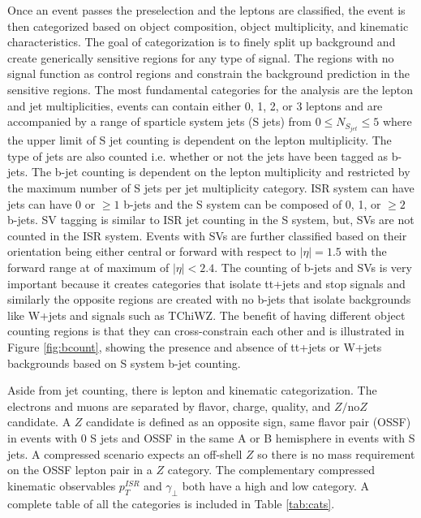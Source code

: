 Once an event passes the preselection and the leptons are classified, the event is then categorized based on object composition, object multiplicity, and kinematic characteristics. The goal of categorization is to finely split up background and create generically sensitive regions for any type of signal. The regions with no signal function as control regions and constrain the background prediction in the sensitive regions. The most fundamental categories for the analysis are the lepton and jet multiplicities, events can contain either 0, 1, 2, or 3 leptons and are accompanied by a range of sparticle system jets (S jets) from $0\leq N_{S_{jet}} \leq 5$ where the upper limit of S jet counting is dependent on the lepton multiplicity. The type of jets are also counted i.e. whether or not the jets have been tagged as b-jets. The b-jet counting is dependent on the lepton multiplicity and restricted by the maximum number of S jets per jet multiplicity category.  ISR system can have jets can have 0 or $\geq 1$ b-jets and the S system can be composed of 0, 1, or $\geq2$ b-jets. SV tagging is similar to ISR jet counting in the S system, but, SVs are not counted in the ISR system. Events with SVs are further classified based on their orientation being either central or forward with respect to $|\eta|=1.5$ with the forward range at of maximum of $|\eta|<2.4$. The counting of b-jets and SVs is very important because it creates categories that isolate tt+jets and stop signals and similarly the opposite regions are created with no b-jets that isolate backgrounds like W+jets and signals such as TChiWZ. The benefit of having different object counting regions is that they can cross-constrain each other and is illustrated in Figure \ref{fig:bcount}, showing the presence and absence of tt+jets or W+jets backgrounds based on S system b-jet counting.

Aside from jet counting, there is lepton and kinematic categorization. The electrons and muons are separated by flavor, charge, quality, and $Z/\text{no} Z$ candidate.  A $Z$ candidate is defined as an opposite sign, same flavor pair (OSSF) in events with 0 S jets and OSSF in the same A or B hemisphere in events with S jets. A compressed scenario expects an off-shell $Z$ so there is no mass requirement on the OSSF lepton pair in a $Z$ category. The complementary compressed kinematic observables $p_T^{ISR}$ and $\gamma_\perp$ both have a high and low category. A complete table of all the categories is included in Table \ref{tab:cats}. 

